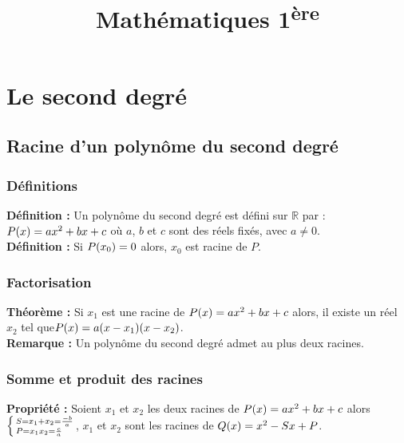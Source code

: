 \documentclass[a4paper,titlepage]{article}
\title{Mathématiques 1\textsuperscript{ère}}
\author{}
\date{}
\let\oldsection\section
\renewcommand\section{\clearpage\oldsection}
\let\oldleft\left
\renewcommand{\left}{\mathopen{}\mathclose\bgroup\oldleft}
\let\oldright\right
\renewcommand{\right}{\aftergroup\egroup\oldright}
\begin{document}
\setlength{\abovedisplayskip}{0cm}
\setlength{\belowdisplayskip}{0cm}
\setlength{\abovedisplayshortskip}{0cm}
\setlength{\belowdisplayshortskip}{0cm}
\setlength{\jot}{0cm}
\maketitle
\null\newpage
\null\newpage
\tableofcontents
\null\newpage
\null\newpage
\null\newpage
\null\newpage
{}
\section{Le second degré}
    \subsection{Racine d’un polynôme du second degré}
        \subsubsection{Définitions}
            \textbf{Définition :} Un polynôme du second degré est défini sur $\mathbb{R}$ par : $P\left(x\right)=ax^{2}+bx+c$ où $a$, $b$ et $c$ sont des réels fixés, avec $a\neq0$.
            \\
            \textbf{Définition :} Si $P\left(x_{0}\right)=0$ alors, $x_{0}$ est racine de $P$.
        \subsubsection{Factorisation}
            \textbf{Théorème :} Si $x_{1}$ est une racine de $P\left(x\right)=ax^{2}+bx+c$ alors, il existe un réel $x_{2}$ tel que\linebreak$P\left(x\right)=a\left(x-x_{1}\right)\left(x-x_{2}\right)$.
            \\
            \textbf{Remarque :} Un polynôme du second degré admet au plus deux racines.
        \subsubsection{Somme et produit des racines}
        \textbf{Propriété :} Soient $x_{1}$ et $x_{2}$ les deux racines de $P\left(x\right)=ax^{2}+bx+c$ alors $\left\{\begin{smallmatrix*}[l]S=x_{1}+x_{2}=\frac{-b}{a}\\P=x_{1}x_{2}=\frac{c}{a}\end{smallmatrix*}\!\right.$, $x_{1}$ et $x_{2}$ sont les racines de $Q\left(x\right)=x^{2}-Sx+P$.
\end{document}
